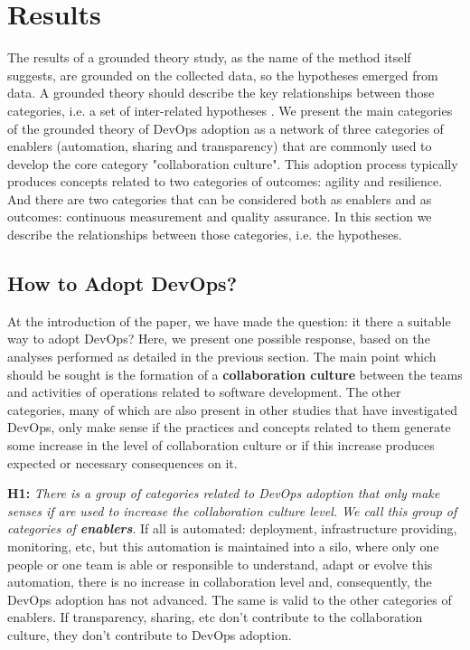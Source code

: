 \section{Results} \label{sec:results}
The results of a grounded theory study, as the name of the method itself suggests, are grounded on the collected data, so the hypotheses emerged from data. A grounded theory should describe the key relationships between those categories, i.e. a set of inter-related hypotheses \cite{hoda2017becoming}. We present the main categories of the grounded theory of DevOps adoption as a network of three categories of enablers (automation, sharing and transparency) that are commonly used to develop the core category "collaboration culture". This adoption process typically produces concepts related to two categories of outcomes: agility and resilience. And there are two categories that can be considered both as enablers and as outcomes: continuous measurement and quality assurance. In this section we describe the relationships between those categories, i.e. the hypotheses.

\subsection{How to Adopt DevOps?}
At the introduction of the paper, we have made the question: it there a
suitable way to adopt DevOps? Here, we present one possible response, based
on the analyses performed as detailed in the previous section. The main point
which should be sought is the formation of a \textbf{collaboration culture}
between the teams and activities of operations related to software development.
The other categories, many of which are also present in other studies that have
investigated DevOps, only make sense if the practices and concepts related to them generate some increase in the level of collaboration culture or if this increase produces expected or necessary consequences on it.

\textbf{H1:} \textit{There is a group of categories related to DevOps adoption that only make senses if are used to increase the collaboration culture level. We call this group of categories of \textbf{enablers}}. If all is automated: deployment, infrastructure providing, monitoring, etc, but this automation is maintained into a silo, where only one people or one team is able or responsible to understand, adapt or evolve this automation, there is no increase in collaboration level and, consequently, the DevOps adoption has not advanced. The same is valid to the other categories of enablers. If transparency, sharing, etc don't contribute to the collaboration culture, they don't contribute to DevOps adoption.

